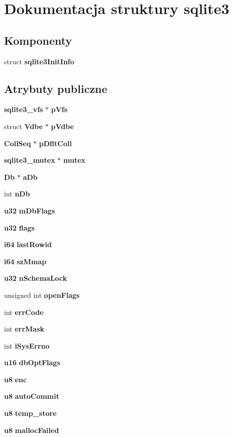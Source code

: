 \section{Dokumentacja struktury sqlite3}
\label{structsqlite3}
\subsection*{Komponenty}
\begin{DoxyCompactItemize}
\item 
struct \textbf{ sqlite3\+Init\+Info}
\end{DoxyCompactItemize}
\subsection*{Atrybuty publiczne}
\begin{DoxyCompactItemize}
\item 
\textbf{ sqlite3\+\_\+vfs} $\ast$ \textbf{ p\+Vfs}
\item 
struct \textbf{ Vdbe} $\ast$ \textbf{ p\+Vdbe}
\item 
\textbf{ Coll\+Seq} $\ast$ \textbf{ p\+Dflt\+Coll}
\item 
\textbf{ sqlite3\+\_\+mutex} $\ast$ \textbf{ mutex}
\item 
\textbf{ Db} $\ast$ \textbf{ a\+Db}
\item 
int \textbf{ n\+Db}
\item 
\textbf{ u32} \textbf{ m\+Db\+Flags}
\item 
\textbf{ u32} \textbf{ flags}
\item 
\textbf{ i64} \textbf{ last\+Rowid}
\item 
\textbf{ i64} \textbf{ sz\+Mmap}
\item 
\textbf{ u32} \textbf{ n\+Schema\+Lock}
\item 
unsigned int \textbf{ open\+Flags}
\item 
int \textbf{ err\+Code}
\item 
int \textbf{ err\+Mask}
\item 
int \textbf{ i\+Sys\+Errno}
\item 
\textbf{ u16} \textbf{ db\+Opt\+Flags}
\item 
\textbf{ u8} \textbf{ enc}
\item 
\textbf{ u8} \textbf{ auto\+Commit}
\item 
\textbf{ u8} \textbf{ temp\+\_\+store}
\item 
\textbf{ u8} \textbf{ malloc\+Failed}
\item 

\end{DoxyCompactItemize}
